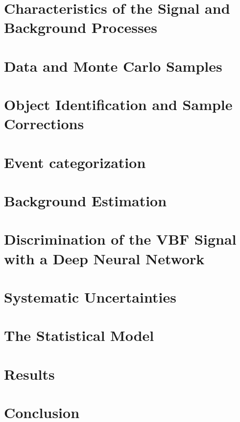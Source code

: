 \section{Characteristics of the Signal and Background Processes}
\label{sec:signal-bkg-characteristics}



\section{Data and Monte Carlo Samples}
\label{sec:data-mc-samples}



\section{Object Identification and Sample Corrections}
\label{sec:object-selection}



\section{Event categorization}
\label{sec:event-categorization}



\section{Background Estimation}
\label{sec:bkg-estimation}


\section{Discrimination of the VBF Signal with a Deep Neural Network}
\label{sec:dnn}



\section{Systematic Uncertainties}
\label{sec:systematics}



\section{The Statistical Model}
\label{sec:stats-analysis}



\section{Results}
\label{sec:hww-results}


\section{Conclusion}
\label{sec:conclusion}
